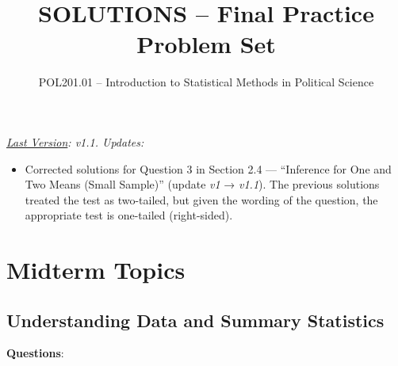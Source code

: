 \documentclass{article}
\title{SOLUTIONS -- Final Practice Problem Set}
\author{POL201.01 -- Introduction to Statistical Methods in Political Science}
\date{}
\begin{document}
\maketitle

\emph{\underline{Last Version}: v1.1. Updates:}
\begin{itemize}
    \item Corrected solutions for Question 3 in Section 2.4 — ``Inference for One and Two Means (Small Sample)” (update \emph{v1} → \emph{v1.1}). The previous solutions treated the test as two-tailed, but given the wording of the question, the appropriate test is one-tailed (right-sided).
\end{itemize}

\section{Midterm Topics}

\subsection{Understanding Data and Summary Statistics}


\textbf{Questions}:
\end{document}
